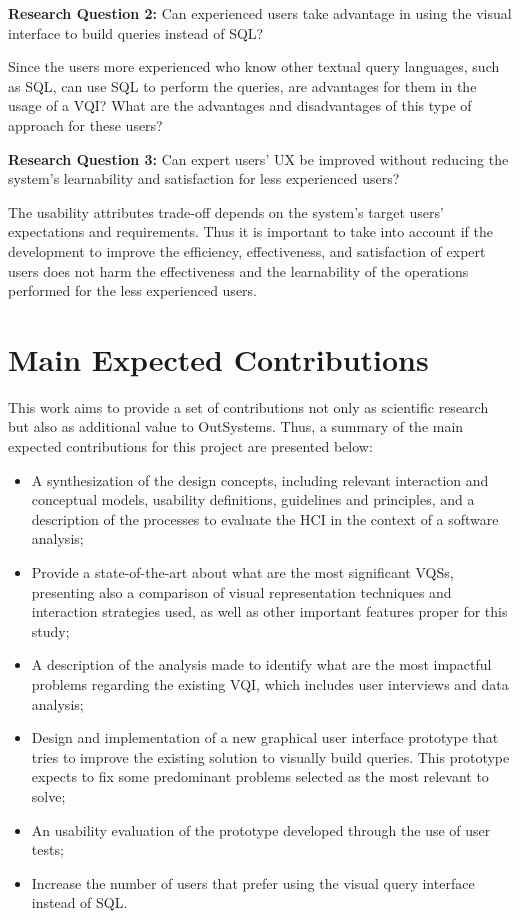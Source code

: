 \textbf{Research Question 2:} Can experienced users take advantage in using the visual interface to build queries instead of \gls{SQL}?

\medskip

Since the users more experienced who know other textual query languages, such as \gls{SQL}, can use \gls{SQL} to perform the queries, are advantages for them in the usage of a \gls{VQI}? What are the advantages and disadvantages of this type of approach for these users?

\medskip

\textbf{Research Question 3:} Can expert users' \gls{UX} be improved without reducing the system's learnability and satisfaction for less experienced users?


\medskip

The usability attributes trade-off depends on the system's target users' expectations and requirements. Thus it is important to take into account if the development to improve the efficiency, effectiveness, and satisfaction of expert users does not harm the effectiveness and the learnability of the operations performed for the less experienced users.

\section{Main Expected Contributions}
\label{sec:main_exp_contributions}
This work aims to provide a set of contributions not only as scientific research but also as additional value to OutSystems. Thus, a summary of the main expected contributions for this project are presented below:

\begin{itemize}
  \item A synthesization of the design concepts, including relevant interaction and conceptual models, usability definitions, guidelines and principles, and a description of the processes to evaluate the \gls{HCI} in the context of a software analysis;
  \item Provide a state-of-the-art about what are the most significant \glspl{VQS}, presenting also a comparison of visual representation techniques and interaction strategies used, as well as other important features proper for this study;
  \item A description of the analysis made to identify what are the most impactful problems regarding the existing \gls{VQI}, which includes user interviews and data analysis;
  \item Design and implementation of a new graphical user interface prototype that tries to improve the existing solution to visually build queries. This prototype expects to fix some predominant problems selected as the most relevant to solve;
  \item An usability evaluation of the prototype developed through the use of user tests;
  \item Increase the number of users that prefer using the visual query interface instead of SQL.
\end{itemize} 

